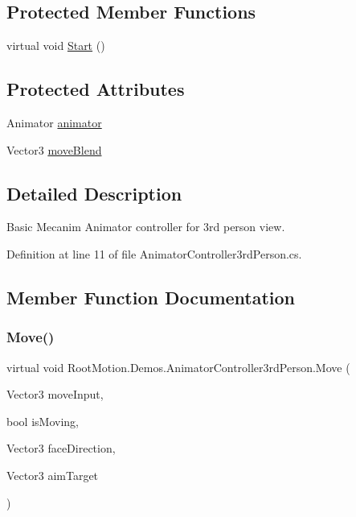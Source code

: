 \subsection*{Protected Member Functions}
\begin{DoxyCompactItemize}
\item 
virtual void \mbox{\hyperlink{class_root_motion_1_1_demos_1_1_animator_controller3rd_person_a3cc5803cad79ca0633394decf1495f16}{Start}} ()
\end{DoxyCompactItemize}
\subsection*{Protected Attributes}
\begin{DoxyCompactItemize}
\item 
Animator \mbox{\hyperlink{class_root_motion_1_1_demos_1_1_animator_controller3rd_person_a547b89739de8d629e509b70e0172d295}{animator}}
\item 
Vector3 \mbox{\hyperlink{class_root_motion_1_1_demos_1_1_animator_controller3rd_person_a84a1f8da0e7b571ec91b17393f7e5732}{move\+Blend}}
\end{DoxyCompactItemize}


\subsection{Detailed Description}
Basic Mecanim Animator controller for 3rd person view. 



Definition at line 11 of file Animator\+Controller3rd\+Person.\+cs.



\subsection{Member Function Documentation}
\mbox{\label{class_root_motion_1_1_demos_1_1_animator_controller3rd_person_a95f02e7fc5456427e1d90f49db79a624}} 
\subsubsection{\texorpdfstring{Move()}{Move()}}
{\footnotesize\ttfamily virtual void Root\+Motion.\+Demos.\+Animator\+Controller3rd\+Person.\+Move (\begin{DoxyParamCaption}\item[{Vector3}]{move\+Input,  }\item[{bool}]{is\+Moving,  }\item[{Vector3}]{face\+Direction,  }\item[{Vector3}]{aim\+Target }\end{DoxyParamCaption})\hspace{0.3cm}{\ttfamily [virtual]}}



